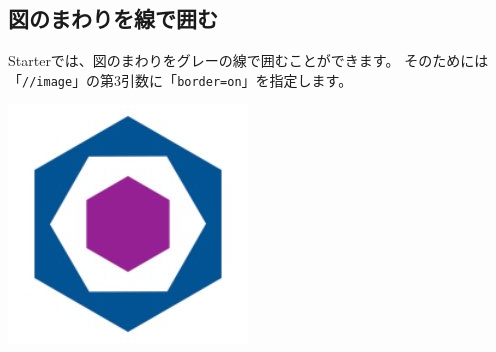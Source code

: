 \subsection*{図のまわりを線で囲む}
\label{sec:1-1-16}

Starterでは、図のまわりをグレーの線で囲むことができます。
そのためには「\texttt{//image}」の第3引数に「\texttt{border=on}」を指定します。

\begin{starterprogram}\end{starterprogram}
\noindent
{}

\starterresult
\begin{reviewimage}[H]%
\includegraphics[width=0.5\maxwidth]{./images/chap01-starter/tw-icon.jpg}%
\label{image:chap01-starter:tw-icon}
\end{reviewimage}
\begin{reviewimage}[H]%
%
\label{image:chap01-starter:tw-icon}
\end{reviewimage}
\endstarterresult

